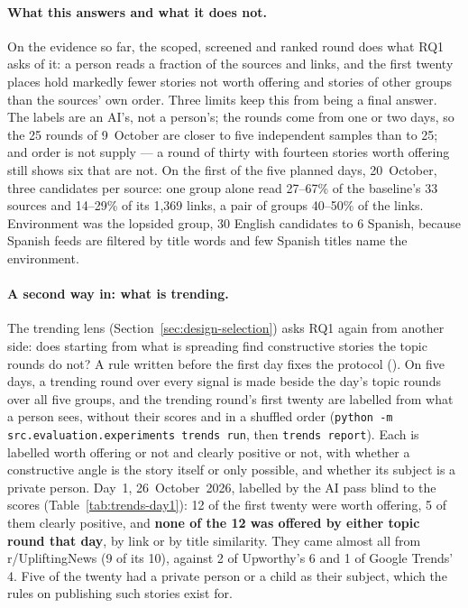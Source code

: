 \paragraph{What this answers and what it does not.} On the evidence so
far, the scoped, screened and ranked round does what RQ1 asks of it: a
person reads a fraction of the sources and links, and the first twenty
places hold markedly fewer stories not worth offering and stories of
other groups than the sources' own order. Three limits keep this from
being a final answer. The labels are an AI's, not a person's; the
rounds come from one or two days, so the 25 rounds of 9~October are
closer to five independent samples than to 25; and order is not supply
--- a round of thirty with fourteen stories worth offering still shows
six that are not.
On the first of the five planned days, 20~October, three candidates per
source: one group alone read 27--67\% of the baseline's 33 sources and
14--29\% of its 1{,}369 links, a pair of groups 40--50\% of the links.
Environment was the lopsided group, 30 English candidates to 6 Spanish,
because Spanish feeds are filtered by title words and few Spanish titles
name the environment.

\paragraph{A second way in: what is trending.} The trending lens
(Section~\ref{sec:design-selection}) asks RQ1 again from another side:
does starting from what is spreading find constructive stories the
topic rounds do not? A rule written before the first day fixes the
protocol ().
On five days, a trending round over every signal is made beside the
day's topic rounds over all five groups, and the trending round's first
twenty are labelled from what a person sees, without their scores and in
a shuffled order (\texttt{python -m src.evaluation.experiments trends
run}, then \texttt{trends report}). Each is labelled worth offering or
not and clearly positive or not, with whether a constructive angle is
the story itself or only possible, and whether its subject is a private
person. Day~1, 26~October~2026, labelled by the AI pass blind to the
scores (Table~\ref{tab:trends-day1}): 12 of the first twenty were worth
offering, 5 of them clearly positive, and \textbf{none of the 12 was
offered by either topic round that day}, by link or by title similarity.
They came almost all from r/UpliftingNews (9 of its 10), against 2 of
Upworthy's 6 and 1 of Google Trends' 4. Five of the twenty had a private
person or a child as their subject, which the rules on publishing such
stories exist for.

